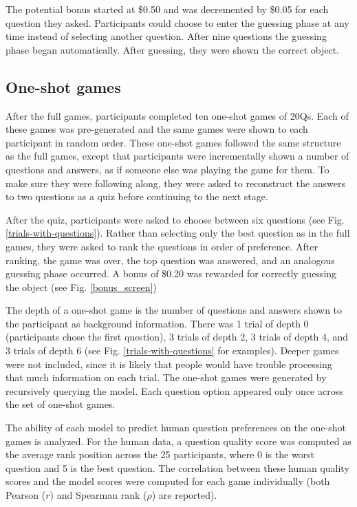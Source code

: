 \documentclass[11pt,letterpaper]{article}
\begin{document}
The potential bonus started at \$0.50 and was decremented by \$0.05 for each question they asked. 
Participants could choose to enter the guessing phase at any time instead of selecting another question. 
After nine questions the guessing phase began automatically. 
After guessing, they were shown the correct object.

\subsection*{One-shot games}
After the full games, participants completed ten one-shot games of 20Qs.
Each of these games was pre-generated and the same games were shown to each participant in random order.
These one-shot games followed the same structure as the full games, except that participants were incrementally shown a number of questions and answers, as if someone else was playing the game for them.
To make sure they were following along, they were asked to reconstruct the answers to two questions as a quiz before continuing to the next stage.

After the quiz, participants were asked to choose between six questions (see Fig. \ref{trials-with-questions}). 
Rather than selecting only the best question as in the full games, they were asked to rank the questions in order of preference. 
After ranking, the game was over, the top question was answered, and an analogous guessing phase occurred.
A bonus of \$0.20 was rewarded for correctly guessing the object (see Fig. \ref{bonus_screen})

The depth of a one-shot game is the number of questions and answers shown to the participant as background information. 
There was 1 trial of depth 0 (participants chose the first question), 3 trials of depth 2, 3 trials of depth 4, and 3 trials of depth 6 (see Fig. \ref{trials-with-questions} for examples). 
Deeper games were not included, since it is likely that people would have trouble processing that much information on each trial. 
The one-shot games were generated by recursively querying the model. 
Each question option appeared only once across the set of one-shot games.

The ability of each model to predict human question preferences on the one-shot games is analyzed. 
For the human data, a question quality score was computed as the average rank position across the 25 participants, where 0 is the worst question and 5 is the best question. 
The correlation between these human quality scores and the model scores were computed for each game individually (both Pearson ($r$) and Spearman rank ($\rho$) are reported).
\end{document}
